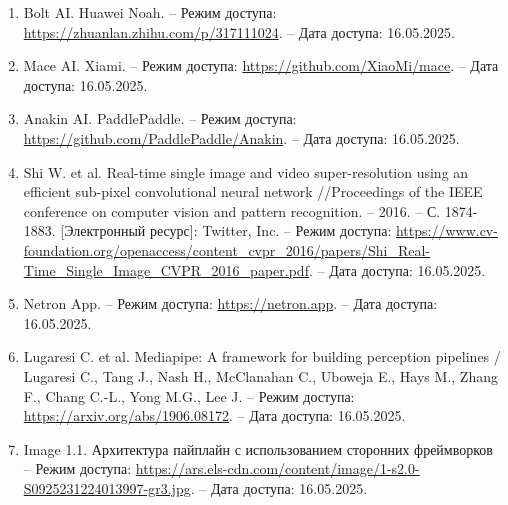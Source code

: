 \documentclass[a4paper,14pt]{extreport}
\begin{document}
\begin{enumerate}
        \item \hypertarget{[7]}{} Bolt AI. Huawei Noah. – Режим доступа: \href{https://zhuanlan.zhihu.com/p/317111024}{https://zhuanlan.zhihu.com/p/317111024}. – Дата доступа: 16.05.2025.

        \item \hypertarget{[8]}{} Mace AI. Xiami. – Режим доступа: \href{https://github.com/XiaoMi/mace}{https://github.com/XiaoMi/mace}. – Дата доступа: 16.05.2025.

        \item \hypertarget{[9]}{} Anakin AI. PaddlePaddle. – Режим доступа: \href{https://github.com/PaddlePaddle/Anakin}{https://github.com/PaddlePaddle/Anakin}. – Дата доступа: 16.05.2025.
        
        \item \hypertarget{[10]}{}Shi W. et al. Real-time single image and video super-resolution using an efficient sub-pixel convolutional neural network //Proceedings of the IEEE conference on computer vision and pattern recognition. – 2016. – С. 1874-1883. [Электронный ресурс]: Twitter, Inc. – Режим доступа: \href{https://www.cv-foundation.org/openaccess/content_cvpr_2016/papers/Shi_Real-Time_Single_Image_CVPR_2016_paper.pdf}{https://www.cv-foundation.org/openaccess/content\_cvpr\_2016/papers/Shi\_Real-Time\_Single\_Image\_CVPR\_2016\_paper.pdf}. – Дата доступа: 16.05.2025.

        \item \hypertarget{[11]}{} Netron App. – Режим доступа: \href{https://netron.app}{https://netron.app}. – Дата доступа: 16.05.2025.
        
        \item \hypertarget{[12]}{}Lugaresi C. et al. Mediapipe: A framework for building perception pipelines / Lugaresi C., Tang J., Nash H., McClanahan C., Uboweja E., Hays M., Zhang F., Chang C.-L., Yong M.G., Lee J. – Режим доступа: \href{https://arxiv.org/abs/1906.08172}{https://arxiv.org/abs/1906.08172}. – Дата доступа: 16.05.2025.
        
        \item \hypertarget{[13]}{} Image 1.1. Архитектура пайплайн с использованием
        сторонних фреймворков – Режим доступа: \href{https://ars.els-cdn.com/content/image/1-s2.0-S0925231224013997-gr3.jpg}{https://ars.els-cdn.com/content/image/1-s2.0-S0925231224013997-gr3.jpg}. – Дата доступа: 16.05.2025.
    \end{enumerate}
    
\end{document}
